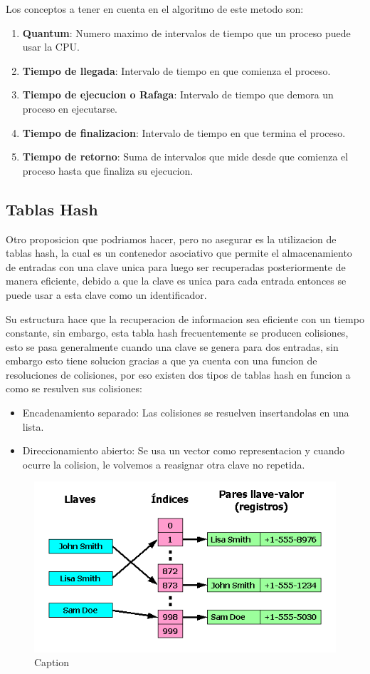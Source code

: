 \documentclass[conference,letterpaper]{IEEEtran}
\begin{document}
Los conceptos a tener en cuenta en el algoritmo de este metodo son:
\begin{enumerate}
    \item \textbf{Quantum}: Numero maximo de intervalos de tiempo que un proceso puede usar la CPU.
    \item \textbf{Tiempo de llegada}: Intervalo de tiempo en que comienza el proceso.
    \item \textbf{Tiempo de ejecucion o Rafaga}: Intervalo de tiempo que demora un proceso en ejecutarse.
    \item \textbf{Tiempo de finalizacion}: Intervalo de tiempo en que termina el proceso.
    \item \textbf{Tiempo de retorno}: Suma de intervalos que mide desde que comienza el proceso hasta que finaliza su ejecucion.
\end{enumerate}

\subsection{Tablas Hash}
Otro proposicion que podriamos hacer, pero no asegurar es la utilizacion de tablas hash, la cual es un contenedor asociativo que permite el almacenamiento de entradas con una clave unica para luego ser recuperadas posteriormente de manera eficiente, debido a que la clave es unica para cada entrada entonces se puede usar a esta clave como un identificador.

Su estructura hace que la recuperacion de informacion sea eficiente con un tiempo constante, sin embargo, esta tabla hash frecuentemente se producen colisiones, esto se pasa generalmente cuando una clave se genera para dos entradas, sin embargo esto tiene solucion gracias a que ya cuenta con una funcion de resoluciones de colisiones, por eso existen dos tipos de tablas hash en funcion a como se resulven sus colisiones:

\begin{itemize}
    \item Encadenamiento separado: Las colisiones se resuelven insertandolas en una lista.
    \item Direccionamiento abierto: Se usa un vector como representacion y cuando ocurre la colision, le volvemos a reasignar otra clave no repetida.
\end{itemize}

\begin{figure}[thpb]
    \centering
    \includegraphics[width=0.55\linewidth]{Tabla_hash1.png}
    \caption{Caption}
    \label{fig:hash}
\end{figure}
\end{document}
